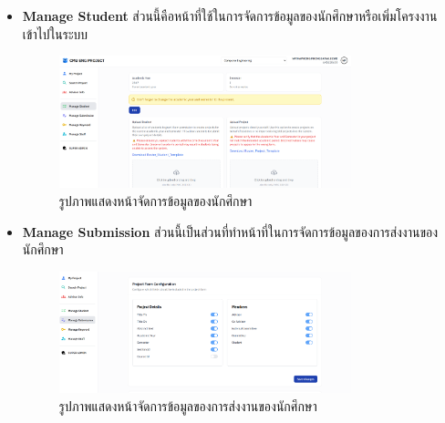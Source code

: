 \begin{itemize}
\begin{figure}[H]
  \end{figure}
  \item \textbf{Manage Student} ส่วนนี้คือหน้าที่ใช้ในการจัดการข้อมูลของนักศึกษาหรือเพิ่มโครงงานเข้าไปในระบบ
  \begin{figure}[H]
    \centering
    \includegraphics[width=0.8\textwidth]{pictures/project_box/manage_student.png}
    \caption{รูปภาพแสดงหน้าจัดการข้อมูลของนักศึกษา}
    \label{fig:manage_student}
    
  \end{figure}

  \item \textbf{Manage Submission} ส่วนนี้เป็นส่วนที่ทำหน้าที่ในการจัดการข้อมูลของการส่งงานของนักศึกษา
  \begin{figure}[H]
    \centering
    \includegraphics[width=0.8\textwidth]{pictures/project_box/manage_submission.png}
    \caption{รูปภาพแสดงหน้าจัดการข้อมูลของการส่งงานของนักศึกษา}
    \label{fig:manage_submission}
\end{figure}


\end{itemize}
